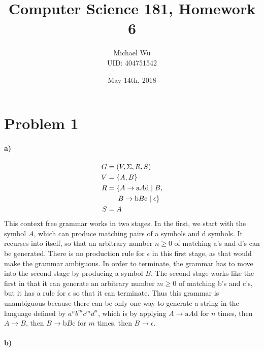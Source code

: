 \documentclass[12pt]{article}
\begin{document}
\title{Computer Science 181, Homework 6}
\date{May 14th, 2018}
\author{Michael Wu\\UID: 404751542}
\maketitle

\section*{Problem 1}

\paragraph{a)}

\begin{align*}
G&=(V,\Sigma,R,S)\\
V&=\{A,B\}\\
R&=\{A\rightarrow \text{a}A\text{d} \mid B,\\
&\hphantom{==}B\rightarrow \text{b}B\text{c} \mid \epsilon\}\\
S&=A
\end{align*}
This context free grammar works in two stages. In the first, we start with the symbol \(A\), which can produce matching pairs of a symbols and d symbols.
It recurses into itself, so that an arbitrary number \(n\geq0\) of matching a's and d's can be generated. There is no production rule for \(\epsilon\) in this first
stage, as that would make the grammar ambiguous. In order to terminate, the grammar has to move into the second stage by producing a symbol \(B\). The second stage
works like the first in that it can generate an arbitrary number \(m\geq0\) of matching b's and c's, but it has a rule for \(\epsilon\) so that it can terminate.
Thus this grammar is unambiguous because there can be only one way to generate a string in the language defined by \(a^nb^mc^md^n\), which is by applying
\(A\rightarrow \text{a}A\text{d}\) for \(n\) times, then \(A\rightarrow B\), then \(B\rightarrow \text{b}B\text{c}\) for \(m\) times, then \(B\rightarrow \epsilon\).

\paragraph{b)}
\end{document}
